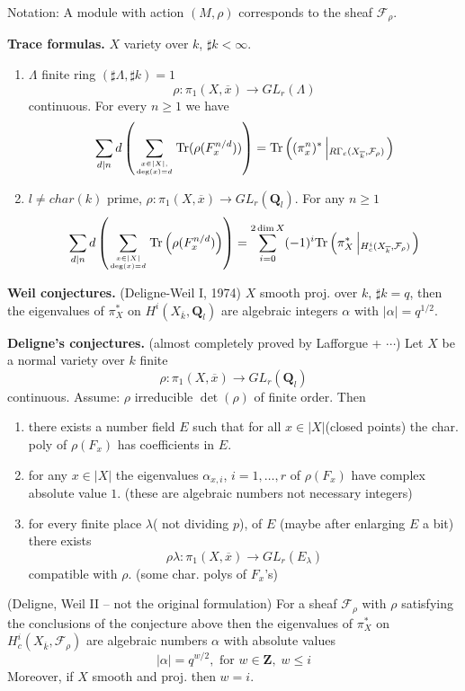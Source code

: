 \noindent
Notation: A module with action $(M, \rho)$ corresponds to the sheaf
$\mathcal{F}_\rho$.

\medskip\noindent
{\bf Trace formulas.} $X$ variety over $k$, $\sharp k<\infty$.
\begin{enumerate}
\item $\Lambda$ finite ring $(\sharp \Lambda, \sharp k)=1$
$$
\rho: \pi_1(X, \overline x)\to GL_r(\Lambda)
$$
continuous. For every $n\geq 1$ we have
$$
\sum_{d|n}d\left(\sum_{x\in |X|,
\atop\deg(x)=d}\text{Tr}(\rho(F_x^{n/d}))\right) =
\text{Tr}\left((\pi_x^n)^*\left|_{R\Gamma_c(X_{\overline k},
\mathcal{F}_\rho)}\right.\right)
$$
\item $l\neq char(k)$ prime, $\rho: \pi_1(X, \overline x)\to
GL_r(\mathbf{Q}_l)$. For any $n\geq 1$
$$
\sum_{d|n} d\left(
\sum_{x\in |X|\atop \deg(x)=d}
\text{Tr}
\left(
\rho(F_x^{n/d})
\right)
\right) =
\sum_{i=0}^{2\dim X}
(-1)^i
\text{Tr}\left(
\pi_X^*\left|_{H_c^i(X_{\overline k}, \mathcal{F}_\rho)}\right.
\right)
$$
\end{enumerate}

\medskip\noindent
{\bf Weil conjectures.} (Deligne-Weil I, 1974) $X$ smooth proj. over $k$,
$\sharp k=q$, then the eigenvalues of $\pi_X^*$ on $H^i(X_{\overline k},
\mathbf{Q}_l)$ are algebraic integers $\alpha$ with $|\alpha|=q^{1/2}$.

\medskip\noindent
{\bf Deligne's conjectures.} (almost completely proved by
Lafforgue + $\cdots$) Let $X$ be a normal variety over $k$ finite
$$
\rho: \pi_1(X, \overline x) \longrightarrow GL_r(\mathbf{Q}_l)
$$
continuous. Assume: $\rho$ irreducible $\det(\rho)$ of finite order. Then
\begin{enumerate}
\item there exists a number field $E$ such that for all $x\in
|X|$(closed points) the char. poly of $\rho(F_x)$ has coefficients in $E$.
\item for any $x\in |X|$ the eigenvalues $\alpha_{x, i}$, $i=1, \ldots,
r$ of $\rho(F_x)$ have complex absolute value $1$.
(these are algebraic numbers not necessary integers)
\item for every finite place $\lambda$( not dividing $p$), of $E$
(maybe after enlarging $E$ a bit) there exists
$$
\rho\lambda: \pi_1(X, \overline x) \to GL_r(E_\lambda)
$$
compatible with $\rho$. (some char. polys of $F_x$'s)
\end{enumerate}

\begin{theorem}
\label{theorem-weil-II}
(Deligne, Weil II -- not the original formulation) For a sheaf
$\mathcal{F}_\rho$ with $\rho$ satisfying the conclusions of the conjecture
above then the eigenvalues of $\pi_X^*$ on $H_c^i(X_{\overline k},
\mathcal{F}_{\rho})$ are algebraic numbers $\alpha$ with absolute values
$$
|\alpha|=q^{w/2}, \text{ for }w\in \mathbf{Z}, \; w\leq i
$$
Moreover, if $X$ smooth and proj. then $w=i$.
\end{theorem}





